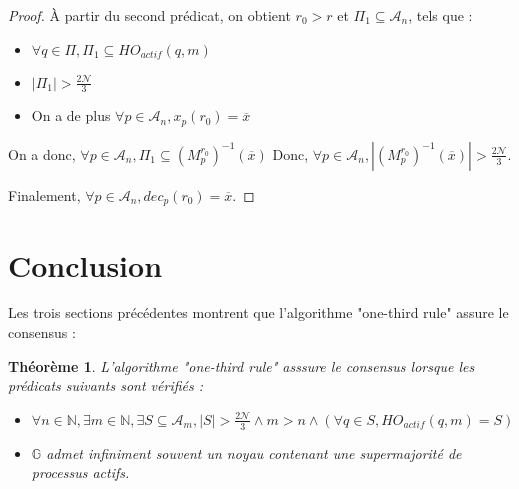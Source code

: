 \documentclass{article}
\newtheorem{theorem}{Théorème}
\begin{document}
\begin{proof}
	À partir du second prédicat, on obtient $r_0 > r$ et $\Pi_1 \subseteq \mathcal{A}_n$, tels que :
	\begin{itemize}

		\item $\forall q \in \Pi, \Pi_1 \subseteq HO_{actif}(q, m)$
		\item $|\Pi_1| > \frac{2\mathcal{N}}{3}$
		\item On a de plus $\forall p \in \mathcal{A}_n, x_p(r_0) = \overline{x}$

	\end{itemize}

	On a donc, $\forall p \in \mathcal{A}_n, \Pi_1 \subseteq (M_p^{r_0})^{-1}(\overline{x}) $
	Donc, $\forall p \in \mathcal{A}_n, |(M_p^{r_0})^{-1}(\overline{x})| > \frac{2\mathcal{N}}{3} $.

	Finalement, $\forall p \in \mathcal{A}_n, dec_p(r_0) = \overline{x}$.

\end{proof}

\section{Conclusion}

Les trois sections précédentes montrent que l'algorithme "one-third rule" assure le consensus :

	\begin{theorem}

		 L'algorithme "one-third rule" asssure le consensus lorsque les prédicats suivants sont vérifiés :
		\begin{itemize}
			\item $\forall n \in \mathds{N}, \exists m \in \mathds{N}, \exists S \subseteq \mathcal{A}_m, |S| > \frac{2\mathcal{N}}{3} \wedge m > n \wedge (\forall q \in S, HO_{actif}(q, m) = S)$
			\item $\mathds{G}$ admet infiniment souvent un noyau contenant une supermajorité de processus actifs.
		\end{itemize}
	\end{theorem}
\end{document}
